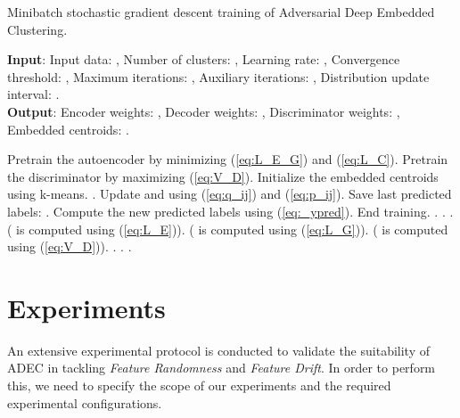 \documentclass{article}
\begin{document}
\begin{algorithm}
\caption{Minibatch stochastic gradient descent training of Adversarial Deep Embedded Clustering.}
\label{alg:algorithm1}
\textbf{Input}: Input data: , Number of clusters: , Learning rate: , Convergence threshold: , Maximum iterations: , Auxiliary iterations: , Distribution update interval: .  \\
\textbf{Output}: Encoder weights: , Decoder weights: , Discriminator weights: , Embedded centroids: .
\begin{algorithmic}\STATE Pretrain the autoencoder by minimizing (\ref{eq:L_E_G}) and (\ref{eq:L_C}).
\STATE Pretrain the discriminator by maximizing (\ref{eq:V_D}).
\STATE Initialize the embedded centroids  using k-means.
\STATE  .
    \IF {()}
        \STATE Update  and  using (\ref{eq:q_ij}) and (\ref{eq:p_ij}).
        \STATE Save last predicted labels: .
        \STATE Compute the new predicted labels  using (\ref{eq:_ypred}).
        \IF {()}
            \STATE End training.
        \ENDIF
    \ENDIF
    \IF {()}
        \STATE .
        \STATE .
        \IF {()}
            \STATE .
        \ENDIF
    \ELSE
        \STATE  ( is computed using (\ref{eq:L_E})).
        \STATE  ( is computed using (\ref{eq:L_G})).
        \STATE  ( is computed using (\ref{eq:V_D})).
        \STATE .
        \STATE .
        \IF {()}
            \STATE .
        \ENDIF
    \ENDIF
\ENDFOR
\end{algorithmic}
\end{algorithm}

\section{Experiments}
An extensive experimental protocol is conducted to validate the suitability of ADEC in tackling \textit{Feature Randomness} and \textit{Feature Drift}. In order to perform this, we need to specify the scope of our experiments and the required experimental configurations. 
\end{document}
